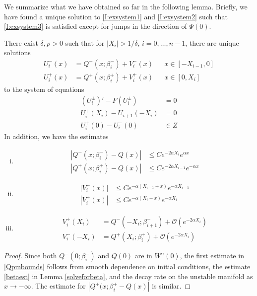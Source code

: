 \documentclass[thesis.tex]{subfiles}
\begin{document}
We summarize what we have obtained so far in the following lemma. Briefly, we have found a unique solution to \eqref{I:exsystem1} and \eqref{I:exsystem2} such that \eqref{I:exsystem3} is satisfied except for jumps in the direction of $\Psi(0)$.


\begin{lemma}\label{solvewithjumps}
There exist $\delta, \rho > 0$ such that for $|X_i| > 1/\delta$, $i = 0, \dots, n-1$, there are unique solutions
\begin{equation*}
\begin{aligned}
U_i^-(x) &= Q^-(x; \beta_i^-) + V_i^-(x) && x \in [-X_{i-1}, 0] \\
U_i^+(x) &= Q^+(x; \beta_i^+) + V_i^+(x) && x \in [0, X_i]
\end{aligned}
\end{equation*}
to the system of equations
\begin{align*}
(U_i^\pm)' - F(U_i^\pm) &= 0 \\
U_i^+(X_i) - U_{i+1}^-(-X_i) &= 0 \\
U_i^+(0) - U_i^-(0) &\in Z 
\end{align*}
In addition, we have the estimates
\begin{enumerate}[(i)]
\item 
\begin{equation}
\begin{aligned}\label{Qpmbounds}
|Q^-(x; \beta_i^-) - Q(x)| &\leq C e^{-2 \alpha X_i} e^{\alpha x} \\
|Q^+(x; \beta_i^+) - Q(x)| &\leq C e^{-2 \alpha X_{i-1}} e^{-\alpha x}
\end{aligned}
\end{equation}
\item
\begin{equation}\label{Vpmbounds}
\begin{aligned}
|V_i^-(x)| &\leq C e^{-\alpha(X_{i-1} + x)}e^{-\alpha X_{i-1}} \\
|V_i^+(x)| &\leq C e^{-\alpha(X_i - x)}e^{-\alpha X_i} 
\end{aligned}
\end{equation}
\item
\begin{equation}\label{VQpm}
\begin{aligned}
V_i^+(X_i) &= Q^-(-X_i; \beta_{i+1}^-) + \mathcal{O}(e^{-2 \alpha X_i}) \\
V_i^-(-X_i) &= Q^+(X_i; \beta_i^+) + \mathcal{O}(e^{-2 \alpha X_i})
\end{aligned}
\end{equation}
\end{enumerate}
\begin{proof}
Since both $Q^-(0; \beta_i^-)$ and $Q(0)$ are in $W^u(0)$, the first estimate in \eqref{Qpmbounds} follows from smooth dependence on initial conditions, the estimate \eqref{betaest} in Lemma \ref{solveforbeta},  and the decay rate on the unstable manifold as $x \rightarrow -\infty$. The estimate for $|Q^+(x; \beta_i^+ - Q(x)|$ is similar.


\end{proof}
\end{lemma}
\end{document}
